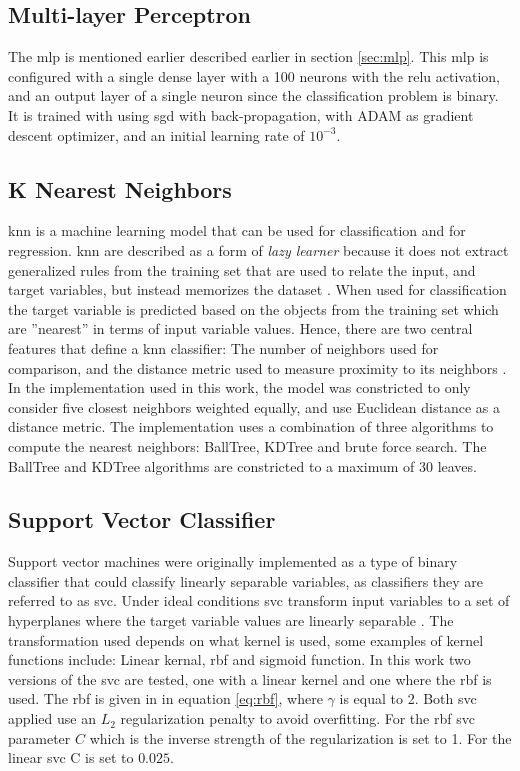 \subsection{Multi-layer Perceptron}
The \acrshort{mlp} is mentioned earlier described earlier in section \ref{sec:mlp}. This \acrshort{mlp} is configured with a single dense layer with a 100 neurons with the \acrshort{relu} activation, and an output layer of a single neuron since the classification problem is binary. It is trained with using \acrshort{sgd} with back-propagation, with ADAM as gradient descent optimizer, and an initial learning rate of $10^{-3}$.

\subsection{K Nearest Neighbors}
\acrfull{knn} is a machine learning model that can be used for classification and for regression. \acrshort{knn} are described as a form of \textit{lazy learner} because it does not extract generalized rules from the training set that are used to relate the input, and target variables, but instead memorizes the dataset \cite{python_machine_learning_2nd}. When used for classification the target variable is predicted based on the objects from the training set which are ''nearest'' in terms of input variable values. Hence, there are two central features that define a \acrshort{knn} classifier: The number of neighbors used for comparison, and the distance metric used to measure proximity to its neighbors \cite{python_machine_learning_2019}. In the implementation used in this work, the model was constricted to only consider five closest neighbors weighted equally, and use Euclidean distance as a distance metric. The implementation uses a combination of three algorithms to compute the nearest neighbors: BallTree, KDTree and brute force search. The BallTree and KDTree algorithms are constricted to a maximum of 30 leaves.

\subsection{Support Vector Classifier}
Support vector machines were originally implemented as a type of binary classifier that could classify linearly separable variables, as classifiers they are referred to as \acrfull{svc}. Under ideal conditions \acrshort{svc} transform input variables to a set of hyperplanes where the target variable values are linearly separable \cite{svm_wikipedia}. The transformation used depends on what kernel is used, some examples of kernel functions include: Linear kernal, \acrfull{rbf} and sigmoid function. In this work two versions of the \acrshort{svc} are tested, one with a linear kernel and one where the \acrshort{rbf} is used. The \acrshort{rbf} is given in in equation \eqref{eq:rbf}, where $\gamma$ is equal to 2. Both \acrshort{svc} applied use an $L_2$ regularization penalty to avoid overfitting. For the \acrshort{rbf} \acrshort{svc} parameter $C$ which is the inverse strength of the regularization is set to 1. For the linear \acrshort{svc} C is set to $0.025$.

